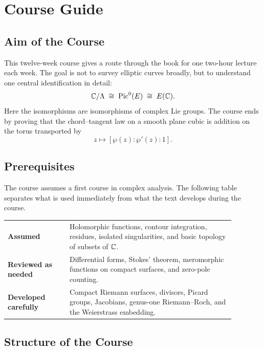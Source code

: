 \chapter*{Course Guide}
\label{front:syllabus}

\section*{Aim of the Course}

This twelve-week course gives a route through the book for one two-hour lecture
each week.  The goal is not to survey elliptic curves broadly, but to understand
one central identification in detail:
\[
  \mathbb{C}/\Lambda \;\cong\; \operatorname{Pic}^0(E) \;\cong\; E(\mathbb{C}).
\]
Here the isomorphisms are isomorphisms of complex Lie groups.  The course ends
by proving that the chord--tangent law on a smooth plane cubic is addition on
the torus transported by
\[
  z\longmapsto[\wp(z):\wp'(z):1].
\]

\section*{Prerequisites}

The course assumes a first course in complex analysis.  The following table
separates what is used immediately from what the text develops during the
course.

\begin{center}
\small
\renewcommand{\arraystretch}{1.18}
\begin{tabular}{@{}L{0.24\linewidth}L{0.64\linewidth}@{}}
\textbf{Assumed} &
Holomorphic functions, contour integration, residues, isolated singularities,
and basic topology of subsets of \(\mathbb{C}\).\\
\textbf{Reviewed as needed} &
Differential forms, Stokes' theorem, meromorphic functions on compact surfaces,
and zero-pole counting.\\
\textbf{Developed carefully} &
Compact Riemann surfaces, divisors, Picard groups, Jacobians,
genus-one Riemann--Roch, and the Weierstrass embedding.
\end{tabular}
\end{center}

\section*{Structure of the Course}

